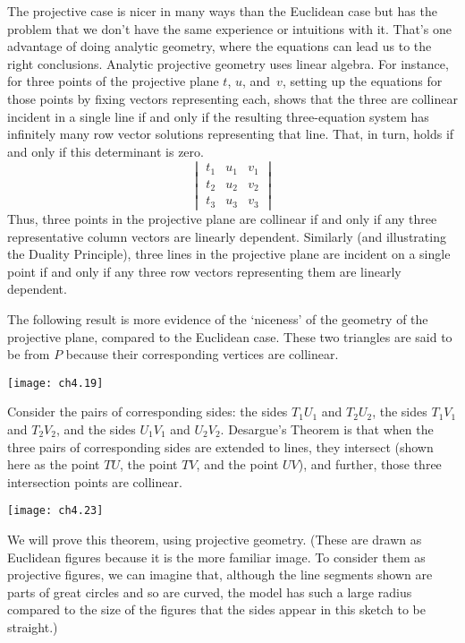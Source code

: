 The projective case is nicer in many ways than the Euclidean case but 
has the problem that we don't have the same experience or
intuitions with it.
That's one advantage of doing analytic geometry, where the equations can 
lead us to the right conclusions.
Analytic projective geometry uses linear algebra.
For instance, for three points of the projective plane
$t$, $u$, and~$v$, 
setting up the equations for those points by fixing vectors representing each,
shows that the three are collinear \Dash  incident 
in a single line \Dash  if and only if the resulting three-equation
system has infinitely many row vector solutions
representing that line.
That, in turn, holds if and only if this determinant is zero.
\begin{equation*}
  \begin{vmatrix}
    t_1  &u_1  &v_1  \\
    t_2  &u_2  &v_2  \\
    t_3  &u_3  &v_3  
  \end{vmatrix}
\end{equation*}
Thus, three points in the projective plane are collinear if and only if
any three representative column vectors are linearly dependent.
Similarly (and illustrating the Duality Principle), 
three lines in the projective plane are incident on a single
point if and only if any three row vectors representing them are linearly
dependent.

The following result is more evidence of the `niceness' 
of the geometry of the projective plane, compared to the Euclidean case.
These two triangles are said to be 
 from $P$ 
because their corresponding vertices are collinear.
\begin{center}
  \texttt{[image: ch4.19]}
\end{center}
Consider the pairs of corresponding sides:
the sides $T_1U_1$ and $T_2U_2$, 
the sides $T_1V_1$ and $T_2V_2$, 
and the sides $U_1V_1$ and $U_2V_2$.
Desargue's Theorem 
is that when the three pairs of corresponding 
sides are extended to lines, they intersect
(shown here as the point $TU$, the point $TV$, and the point $UV$),
and further, those three intersection points are collinear.
\begin{center}
  \texttt{[image: ch4.23]}
\end{center}
We will prove this theorem, using projective geometry.
(These are drawn as Euclidean figures because it is the more familiar image.
To consider them as projective figures,
we can imagine that, although the line segments shown are parts of great 
circles and so are curved,
the model has such a large radius compared to the size of the 
figures that the sides appear in this sketch to be straight.)

